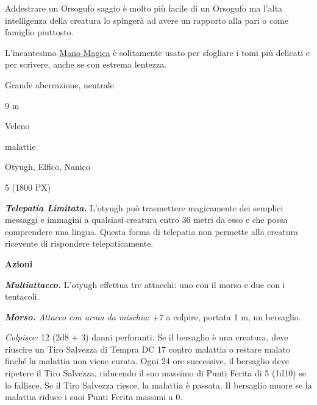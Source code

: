 \begin{multicols}{2}
{Addestrare un Orsogufo saggio è molto più facile di un Orsogufo ma l'alta intelligenza della creatura lo spingerà ad avere un rapporto alla pari o come famiglio piuttosto.

L'incantesimo \hyperlink{Mano Magica}{Mano Magica} è solitamente usato per sfogliare i tomi più delicati e per scrivere, anche se con estrema lentezza.

\begin{description}[noitemsep, topsep=0pt, parsep=0pt, partopsep=0pt, itemsep=1pt, leftmargin=2.35cm,  labelwidth=2.2cm, itemindent=0cm, listparindent=0pt] %
\setlength{\baselineskip}{10pt}
\item[\textbf{Taglia/Tipo}] Grande aberrazione, neutrale
\item[\textbf{Caratt.}] 
\item[\textbf{Punti Ferita}] 
\item[\textbf{Movimento}] 9 m
\item[\textbf{Tiri Salvez.}] 
\item[\textbf{Imm. Danni}] Veleno
\item[\textbf{Immunità}] malattie
\item[\textbf{Sensi}] 
\item[\textbf{Linguaggi}] Otyugh, Elfico, Nanico
\item[\textbf{Sfida}] 5 (1800 PX)
\end{description}
\smallskip

\emph{\textbf{Telepatia Limitata.}} L'otyugh può trasmettere magicamente dei semplici messaggi e immagini a qualsiasi creatura entro 36 metri da esso e che possa comprendere una lingua. Questa forma di telepatia non permette alla creatura ricevente di rispondere telepaticamente.

\textbf{Azioni}

\emph{\textbf{Multiattacco.}} L'otyugh effettua tre attacchi: uno con il morso e due con i tentacoli.

\emph{\textbf{Morso.} Attacco con arma da mischia}: +7 a colpire, portata 1 m, un bersaglio.

\emph{Colpisce:} 12 (2d8 + 3) danni perforanti. Se il bersaglio è una creatura, deve riuscire un Tiro Salvezza di Tempra DC 17 contro malattia o restare malato finché la malattia non viene curata. Ogni 24 ore successive, il bersaglio deve ripetere il Tiro Salvezza, riducendo il suo massimo di Punti Ferita di 5 (1d10) se lo fallisce. Se il Tiro Salvezza riesce, la malattia è passata. Il bersaglio muore se la malattia riduce i suoi Punti Ferita massimi a 0.

}
\end{multicols}

